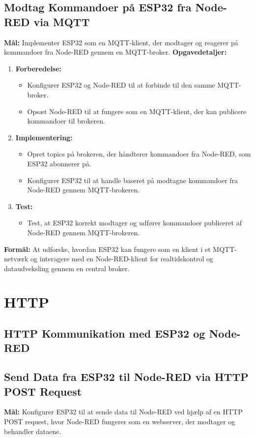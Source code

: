 \subsection*{Modtag Kommandoer på ESP32 fra Node-RED via MQTT}
\textbf{Mål:} Implementer ESP32 som en MQTT-klient, der modtager og reagerer på kommandoer fra Node-RED gennem en MQTT-broker.
\newline\newline\noindent
\textbf{Opgavedetaljer:}
\begin{enumerate}
	\item \textbf{Forberedelse:}
	\begin{itemize}
		\item Konfigurer ESP32 og Node-RED til at forbinde til den samme MQTT-broker.
		\item Opsæt Node-RED til at fungere som en MQTT-klient, der kan publicere kommandoer til brokeren.
	\end{itemize}
	\item \textbf{Implementering:}
	\begin{itemize}
		\item Opret topics på brokeren, der håndterer kommandoer fra Node-RED, som ESP32 abonnerer på.
		\item Konfigurer ESP32 til at handle baseret på modtagne kommandoer fra Node-RED gennem MQTT-brokeren.
	\end{itemize}
	\item \textbf{Test:}
	\begin{itemize}
		\item Test, at ESP32 korrekt modtager og udfører kommandoer publiceret af Node-RED gennem MQTT-brokeren.
	\end{itemize}
\end{enumerate}
\textbf{Formål:} At udforske, hvordan ESP32 kan fungere som en klient i et MQTT-netværk og interagere med en Node-RED-klient for realtidskontrol og dataudveksling gennem en central broker.

\section{HTTP}
\subsection*{HTTP Kommunikation med ESP32 og Node-RED}
\subsection*{Send Data fra ESP32 til Node-RED via HTTP POST Request}
\textbf{Mål:} Konfigurer ESP32 til at sende data til Node-RED ved hjælp af en HTTP POST request, hvor Node-RED fungerer som en webserver, der modtager og behandler dataene.

